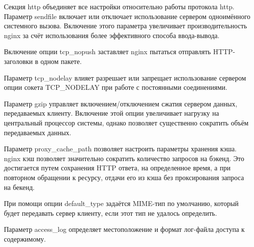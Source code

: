 \documentclass[a4paper,14pt]{extarticle}
\begin{document}
 	Секция http объединяет все настройки относительно работы протокола http.
 	Параметр sendfile включает или отключает использование сервером одноимённого системного вызова. Включение этого параметра увеличивает производительность nginx за счёт использования более эффективного способа ввода-вывода.
 	
 	Включение опции tcp\_nopush заставляет nginx пытаться отправлять HTTP-заголовки в одном пакете.
 	
 	Параметр tcp\_nodelay влияет разрешает или запрещает использование сервером опции сокета TCP\_NODELAY при работе с постоянными соединениями.
 	
 	Параметр gzip управляет включением/отключением сжатия сервером данных, передаваемых клиенту. Включение этой опции увеличивает нагрузку на центральный процессор системы, однако позволяет существенно сократить объём передаваемых данных.
 	
 	Параметр proxy\_cache\_path позволяет настроить параметры хранения кэша. nginx кэш позволяет значительно сократить количество запросов на бэкенд. Это достигается путем сохранения HTTP ответа, на определенное время, а при повторном обращении к ресурсу, отдачи его из кэша без проксирования запроса на бекенд.
 	
 	При помощи опции default\_type задаётся MIME-тип по умолчанию, который будет передавать сервер клиенту, если этот тип не удалось определить.
 	
 	Параметр access\_log определяет местоположение и формат лог-файла доступа к содержимому.
 	
\end{document}
